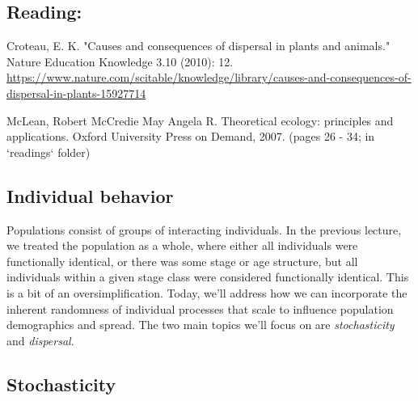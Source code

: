\documentclass[12pt]{article}
\begin{document}
\subsection*{Reading:}

Croteau, E. K. "Causes and consequences of dispersal in plants and animals." Nature Education Knowledge 3.10 (2010): 12. \\ \url{https://www.nature.com/scitable/knowledge/library/causes-and-consequences-of-dispersal-in-plants-15927714} \\

\bigskip

McLean, Robert McCredie May Angela R. Theoretical ecology: principles and applications. Oxford University Press on Demand, 2007. (pages 26 - 34; in `readings` folder)



















\begin{center}
\noindent\hrulefill 
\end{center}


\clearpage

\subsection*{Individual behavior}

Populations consist of groups of interacting individuals. In the previous lecture, we treated the population as a whole, where either all individuals were functionally identical, or there was some stage or age structure, but all individuals within a given stage class were considered functionally identical. This is a bit of an oversimplification. Today, we'll address how we can incorporate the inherent randomness of individual processes that scale to influence population demographics and spread. The two main topics we'll focus on are \textit{stochasticity} and \textit{dispersal}.






\clearpage

\subsection*{Stochasticity}
\end{document}
